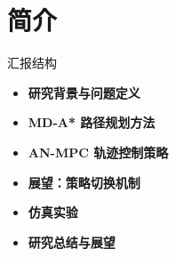 \section{简介}

\begin{frame}{汇报结构}
  \begin{itemize}
    \item \textbf{研究背景与问题定义}
    \item \textbf{MD-A* 路径规划方法}
    \item \textbf{AN-MPC 轨迹控制策略}
    \item \textbf{展望：策略切换机制}
    \item \textbf{仿真实验}
    \item \textbf{研究总结与展望}
  \end{itemize}
  \end{frame}
  





